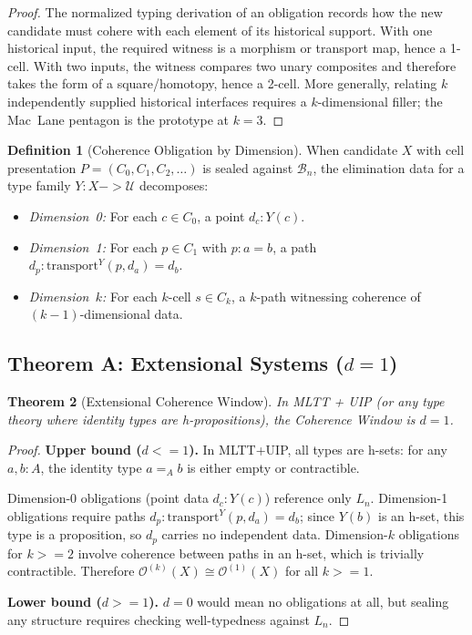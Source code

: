 \documentclass[11pt,a4paper]{article}
\def\leq{<=}%
\def\geq{>=}%
\def\to{->}%
\theoremstyle{plain}
\newtheorem{theorem}{Theorem}[section]
\theoremstyle{definition}
\newtheorem{definition}[theorem]{Definition}
\theoremstyle{remark}
\newcommand{\U}{\mathcal{U}}
\begin{document}
\begin{proof}
The normalized typing derivation of an obligation records how the new candidate must cohere with each element of its historical support.
With one historical input, the required witness is a morphism or transport map, hence a 1-cell.
With two inputs, the witness compares two unary composites and therefore takes the form of a square/homotopy, hence a 2-cell.
More generally, relating $k$ independently supplied historical interfaces requires a $k$-dimensional filler; the Mac~Lane pentagon is the prototype at $k = 3$.
\end{proof}

\begin{definition}[Coherence Obligation by Dimension]
\label{def:dim-obligation}
When candidate $X$ with cell presentation $P = (C_0, C_1, C_2, \ldots)$ is sealed against $\mathcal{B}_n$, the elimination data for a type family $Y : X \to \U$ decomposes:
\begin{itemize}[nosep]
    \item \emph{Dimension~0:} For each $c \in C_0$, a point $d_c : Y(c)$.
    \item \emph{Dimension~1:} For each $p \in C_1$ with $p : a = b$, a path $d_p : \mathrm{transport}^Y(p, d_a) = d_b$.
    \item \emph{Dimension~$k$:} For each $k$-cell $s \in C_k$, a $k$-path witnessing coherence of $(k{-}1)$-dimensional data.
\end{itemize}
\end{definition}

\subsection{\texorpdfstring{Theorem A: Extensional Systems ($d = 1$)}{Theorem A: Extensional Systems (d = 1)}}

\begin{theorem}[Extensional Coherence Window]
\label{thm:ext-window}
In MLTT + UIP (or any type theory where identity types are h-propositions), the Coherence Window is $d = 1$.
\end{theorem}

\begin{proof}
\textbf{Upper bound ($d \leq 1$).}
In MLTT+UIP, all types are h-sets: for any $a, b : A$, the identity type $a =_A b$ is either empty or contractible.

Dimension-0 obligations (point data $d_c : Y(c)$) reference only $L_n$.
Dimension-1 obligations require paths $d_p : \mathrm{transport}^Y(p, d_a) = d_b$; since $Y(b)$ is an h-set, this type is a proposition, so $d_p$ carries no independent data.
Dimension-$k$ obligations for $k \geq 2$ involve coherence between paths in an h-set, which is trivially contractible.
Therefore $\mathcal{O}^{(k)}(X) \cong \mathcal{O}^{(1)}(X)$ for all $k \geq 1$.

\medskip\noindent\textbf{Lower bound ($d \geq 1$).}
$d = 0$ would mean no obligations at all, but sealing any structure requires checking well-typedness against $L_n$.
\end{proof}
\end{document}
